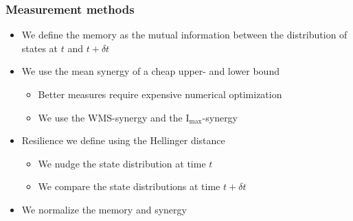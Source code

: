 \documentclass[hyperref={pdfpagelabels=false}]{beamer}
\begin{document}
\begin{frame}
\frametitle{Measurement methods}
\begin{itemize}
\item We define the memory as the mutual information between the distribution of states at $t$ and $t + \delta t$
\item We use the mean synergy of a cheap upper- and lower bound
\begin{itemize}
\item Better measures require expensive numerical optimization
\item We use the WMS-synergy and the $\mathrm{I}_\mathrm{max}$-synergy
\end{itemize}
\item Resilience we define using the Hellinger distance
\begin{itemize}
\item We nudge the state distribution at time $t$
\item We compare the state distributions at time $t + \delta t$
\end{itemize}
\item We normalize the memory and synergy
\end{itemize}
\end{frame}
\end{document}
